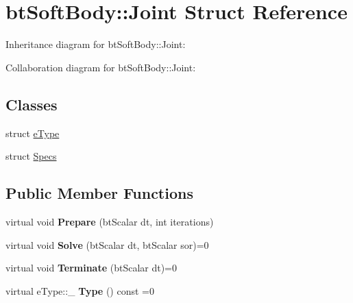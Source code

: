 \hypertarget{structbt_soft_body_1_1_joint}{\section{bt\+Soft\+Body\+:\+:Joint Struct Reference}
\label{structbt_soft_body_1_1_joint}
}


Inheritance diagram for bt\+Soft\+Body\+:\+:Joint\+:


Collaboration diagram for bt\+Soft\+Body\+:\+:Joint\+:
\subsection*{Classes}
\begin{DoxyCompactItemize}
\item 
struct \hyperlink{structbt_soft_body_1_1_joint_1_1e_type}{e\+Type}
\item 
struct \hyperlink{structbt_soft_body_1_1_joint_1_1_specs}{Specs}
\end{DoxyCompactItemize}
\subsection*{Public Member Functions}
\begin{DoxyCompactItemize}
\item 
\hypertarget{structbt_soft_body_1_1_joint_acde4b979f83417395c2b534d450077c5}{virtual void {\bfseries Prepare} (bt\+Scalar dt, int iterations)}\label{structbt_soft_body_1_1_joint_acde4b979f83417395c2b534d450077c5}

\item 
\hypertarget{structbt_soft_body_1_1_joint_a4945523933c9f51e2d65321579192a54}{virtual void {\bfseries Solve} (bt\+Scalar dt, bt\+Scalar sor)=0}\label{structbt_soft_body_1_1_joint_a4945523933c9f51e2d65321579192a54}

\item 
\hypertarget{structbt_soft_body_1_1_joint_a99c5a0d847dbdc5fd9bd8cade288482f}{virtual void {\bfseries Terminate} (bt\+Scalar dt)=0}\label{structbt_soft_body_1_1_joint_a99c5a0d847dbdc5fd9bd8cade288482f}

\item 
\hypertarget{structbt_soft_body_1_1_joint_ae2c4301272e3e9aae0e84431cd4059f9}{virtual e\+Type\+::\+\_\+ {\bfseries Type} () const =0}\label{structbt_soft_body_1_1_joint_ae2c4301272e3e9aae0e84431cd4059f9}

\end{DoxyCompactItemize}
